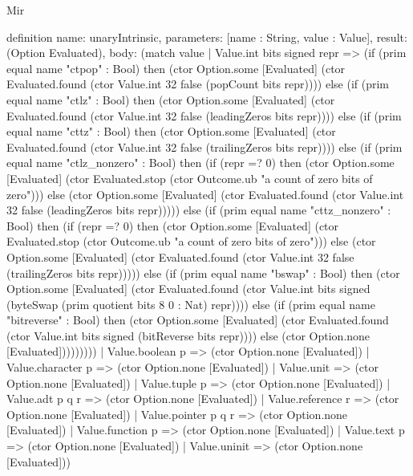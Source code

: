 \begin{lexlean}{Mir}
\begin{semanticmodule}
definition{
  name: unaryIntrinsic,
  parameters: [name : String, value : Value],
  result: (Option Evaluated),
  body: (match value
    | Value.int bits signed repr => (if (prim equal name "ctpop" : Bool) then (ctor Option.some [Evaluated] (ctor Evaluated.found (ctor Value.int 32 false (popCount bits repr)))) else (if (prim equal name "ctlz" : Bool) then (ctor Option.some [Evaluated] (ctor Evaluated.found (ctor Value.int 32 false (leadingZeros bits repr)))) else (if (prim equal name "cttz" : Bool) then (ctor Option.some [Evaluated] (ctor Evaluated.found (ctor Value.int 32 false (trailingZeros bits repr)))) else (if (prim equal name "ctlz_nonzero" : Bool) then (if (repr =? 0) then (ctor Option.some [Evaluated] (ctor Evaluated.stop (ctor Outcome.ub "a count of zero bits of zero"))) else (ctor Option.some [Evaluated] (ctor Evaluated.found (ctor Value.int 32 false (leadingZeros bits repr))))) else (if (prim equal name "cttz_nonzero" : Bool) then (if (repr =? 0) then (ctor Option.some [Evaluated] (ctor Evaluated.stop (ctor Outcome.ub "a count of zero bits of zero"))) else (ctor Option.some [Evaluated] (ctor Evaluated.found (ctor Value.int 32 false (trailingZeros bits repr))))) else (if (prim equal name "bswap" : Bool) then (ctor Option.some [Evaluated] (ctor Evaluated.found (ctor Value.int bits signed (byteSwap (prim quotient bits 8 0 : Nat) repr)))) else (if (prim equal name "bitreverse" : Bool) then (ctor Option.some [Evaluated] (ctor Evaluated.found (ctor Value.int bits signed (bitReverse bits repr)))) else (ctor Option.none [Evaluated]))))))))
    | Value.boolean p => (ctor Option.none [Evaluated])
    | Value.character p => (ctor Option.none [Evaluated])
    | Value.unit => (ctor Option.none [Evaluated])
    | Value.tuple p => (ctor Option.none [Evaluated])
    | Value.adt p q r => (ctor Option.none [Evaluated])
    | Value.reference r => (ctor Option.none [Evaluated])
    | Value.pointer p q r => (ctor Option.none [Evaluated])
    | Value.function p => (ctor Option.none [Evaluated])
    | Value.text p => (ctor Option.none [Evaluated])
    | Value.uninit => (ctor Option.none [Evaluated]))
}


\end{semanticmodule}
\end{lexlean}
